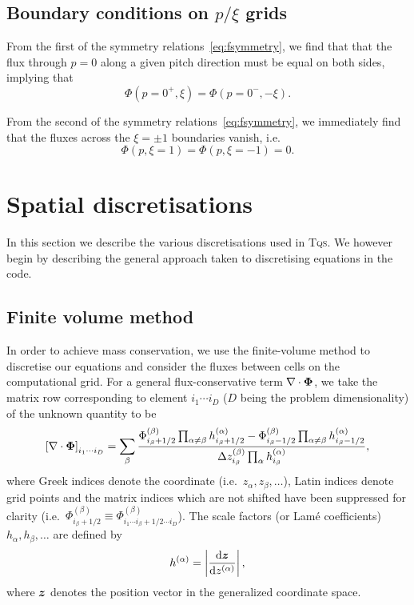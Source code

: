 \documentclass{notes}
\newcommand{\TQS}{\textsc{Tqs}}
\begin{document}
    \subsection{Boundary conditions on $p/\xi$ grids}
    From the first of the symmetry relations~\eqref{eq:fsymmetry}, we find that
    that the flux through $p=0$ along a given pitch direction must be equal on
    both sides, implying that
    \begin{equation}
        \Phi\left(p=0^+, \xi\right) = \Phi\left(p=0^-, -\xi\right).
    \end{equation}

    From the second of the symmetry relations~\eqref{eq:fsymmetry}, we
    immediately find that the fluxes across the $\xi=\pm1$ boundaries vanish,
    i.e.\
    \begin{equation}\label{eq:bc:xiInternal}
        \Phi(p, \xi=1) = \Phi(p, \xi=-1) = 0.
    \end{equation}

    \section{Spatial discretisations}
    In this section we describe the various discretisations used in \TQS. We
    however begin by describing the general approach taken to discretising
    equations in the code.

    \subsection{Finite volume method}
    In order to achieve mass conservation, we use the finite-volume method to
    discretise our equations and consider the fluxes between cells on the
    computational grid. For a general flux-conservative term
    $\nabla\cdot\boldsymbol{\Phi}$, we take the matrix row corresponding to element
    $i_1\cdots i_D$ ($D$ being the problem dimensionality) of the unknown
    quantity to be
    \begin{equation}
        \left[ \nabla\cdot\boldsymbol{\Phi} \right]_{i_1\cdots i_D}  =
            \sum_\beta \frac{
                \Phi^{(\beta)}_{i_\beta+1/2}\prod_{\alpha\neq\beta} h^{(\alpha)}_{i_\beta+1/2} -
                \Phi^{(\beta)}_{i_\beta-1/2}\prod_{\alpha\neq\beta} h^{(\alpha)}_{i_\beta-1/2}
            }{\Delta z^{(\beta)}_{i_\beta}\prod_\alpha h^{(\alpha)}_{i_\beta}},
    \end{equation}
    where Greek indices denote the coordinate (i.e.\
    $z_\alpha, z_\beta, \ldots$), Latin indices denote grid points
    and the matrix indices which are not shifted have been suppressed for
    clarity (i.e.\
    $\Phi^{(\beta)}_{i_\beta+1/2}\equiv\Phi^{(\beta)}_{i_1\cdots i_\beta+1/2\cdots i_D}$).
    The scale factors (or Lam\'e coefficients) $h_\alpha, h_\beta, \ldots$ are
    defined by
    \begin{equation}
        h^{(\alpha)} = \left| \frac{\mathrm{d}\boldsymbol{z}}{\mathrm{d} z^{(\alpha)}}\right|,
    \end{equation}
    where $\boldsymbol{z}$ denotes the position vector in the generalized coordinate
    space.
\end{document}
